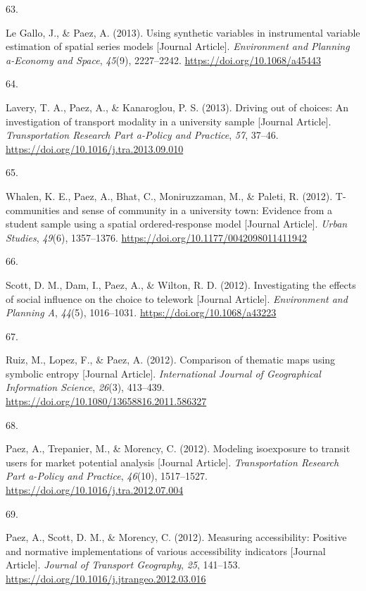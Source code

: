 \documentclass[10pt,a4paper,]{twentysecondcv}
\newlength{\csllabelwidth}
\newcommand{\CSLLeftMargin}[1]{\parbox[t]{\csllabelwidth}{#1}}
\newcommand{\CSLRightInline}[1]{\parbox[t]{\linewidth - \csllabelwidth}{#1}}
\begin{document}
\leavevmode{}%
\CSLLeftMargin{63. }%
\CSLRightInline{Le Gallo, J., \& Paez, A. (2013). Using synthetic
variables in instrumental variable estimation of spatial series models
{[}Journal Article{]}. \emph{Environment and Planning a-Economy and
Space}, \emph{45}(9), 2227--2242. \url{https://doi.org/10.1068/a45443}}

\leavevmode{}%
\CSLLeftMargin{64. }%
\CSLRightInline{Lavery, T. A., Paez, A., \& Kanaroglou, P. S. (2013).
Driving out of choices: An investigation of transport modality in a
university sample {[}Journal Article{]}. \emph{Transportation Research
Part a-Policy and Practice}, \emph{57}, 37--46.
\url{https://doi.org/10.1016/j.tra.2013.09.010}}

\leavevmode{}%
\CSLLeftMargin{65. }%
\CSLRightInline{Whalen, K. E., Paez, A., Bhat, C., Moniruzzaman, M., \&
Paleti, R. (2012). T-communities and sense of community in a university
town: Evidence from a student sample using a spatial ordered-response
model {[}Journal Article{]}. \emph{Urban Studies}, \emph{49}(6),
1357--1376. \url{https://doi.org/10.1177/0042098011411942}}

\leavevmode{}%
\CSLLeftMargin{66. }%
\CSLRightInline{Scott, D. M., Dam, I., Paez, A., \& Wilton, R. D.
(2012). Investigating the effects of social influence on the choice to
telework {[}Journal Article{]}. \emph{Environment and Planning A},
\emph{44}(5), 1016--1031. \url{https://doi.org/10.1068/a43223}}

\leavevmode{}%
\CSLLeftMargin{67. }%
\CSLRightInline{Ruiz, M., Lopez, F., \& Paez, A. (2012). Comparison of
thematic maps using symbolic entropy {[}Journal Article{]}.
\emph{International Journal of Geographical Information Science},
\emph{26}(3), 413--439.
\url{https://doi.org/10.1080/13658816.2011.586327}}

\leavevmode{}%
\CSLLeftMargin{68. }%
\CSLRightInline{Paez, A., Trepanier, M., \& Morency, C. (2012). Modeling
isoexposure to transit users for market potential analysis {[}Journal
Article{]}. \emph{Transportation Research Part a-Policy and Practice},
\emph{46}(10), 1517--1527.
\url{https://doi.org/10.1016/j.tra.2012.07.004}}

\leavevmode{}%
\CSLLeftMargin{69. }%
\CSLRightInline{Paez, A., Scott, D. M., \& Morency, C. (2012). Measuring
accessibility: Positive and normative implementations of various
accessibility indicators {[}Journal Article{]}. \emph{Journal of
Transport Geography}, \emph{25}, 141--153.
\url{https://doi.org/10.1016/j.jtrangeo.2012.03.016}}
\end{document}
